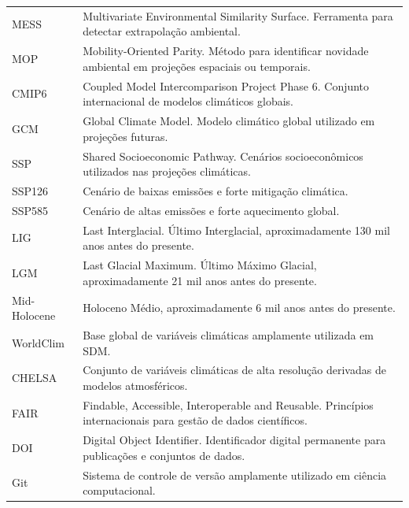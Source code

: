 \begin{longtable}{
		p{}
		p{}
	}
	MESS &
	Multivariate Environmental Similarity Surface. Ferramenta para detectar extrapolação ambiental.
	\\
	
	MOP &
	Mobility-Oriented Parity. Método para identificar novidade ambiental em projeções espaciais ou temporais.
	\\
	
	CMIP6 &
	Coupled Model Intercomparison Project Phase 6. Conjunto internacional de modelos climáticos globais.
	\\
	
	GCM &
	Global Climate Model. Modelo climático global utilizado em projeções futuras.
	\\
	
	SSP &
	Shared Socioeconomic Pathway. Cenários socioeconômicos utilizados nas projeções climáticas.
	\\
	
	SSP126 &
	Cenário de baixas emissões e forte mitigação climática.
	\\
	
	SSP585 &
	Cenário de altas emissões e forte aquecimento global.
	\\
	
	LIG &
	Last Interglacial. Último Interglacial, aproximadamente 130 mil anos antes do presente.
	\\
	
	LGM &
	Last Glacial Maximum. Último Máximo Glacial, aproximadamente 21 mil anos antes do presente.
	\\
	
	Mid-Holocene &
	Holoceno Médio, aproximadamente 6 mil anos antes do presente.
	\\
	
	WorldClim &
	Base global de variáveis climáticas amplamente utilizada em SDM.
	\\
	
	CHELSA &
	Conjunto de variáveis climáticas de alta resolução derivadas de modelos atmosféricos.
	\\
	
	FAIR &
	Findable, Accessible, Interoperable and Reusable. Princípios internacionais para gestão de dados científicos.
	\\
	
	DOI &
	Digital Object Identifier. Identificador digital permanente para publicações e conjuntos de dados.
	\\
	
	Git &
	Sistema de controle de versão amplamente utilizado em ciência computacional.
	\\
	

\end{longtable}
